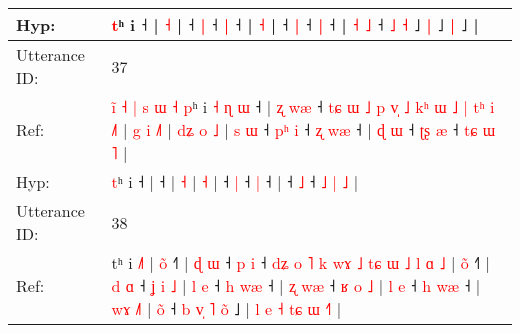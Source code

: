 \documentclass[10pt]{article}
\DeclareRobustCommand{\hl}[1]{{\textcolor{red}{#1}}}
\begin{document}
\begin{longtable}{ll}
 \\
Hyp: & \hl{}\hl{}\hl{}\hl{}\hl{}\hl{}\hl{}\hl{}\hl{}\hl{}\hl{}\hl{}\hl{}\hl{t}ʰ\hl{}\hl{}\hl{}\hl{}\hl{}\hl{} i ˧\hl{}\hl{}\hl{}\hl{}\hl{}\hl{} |\hl{}\hl{}\hl{}\hl{}\hl{} \hl{}\hl{˧} |\hl{}\hl{}\hl{}\hl{} ˧\hl{}\hl{}\hl{} \hl{|} ˧\hl{}\hl{} \hl{|} ˧ |\hl{}\hl{}\hl{}\hl{}\hl{}\hl{}\hl{}\hl{}\hl{}\hl{}\hl{}\hl{}\hl{}\hl{}\hl{}\hl{}\hl{}\hl{}\hl{}\hl{}\hl{}\hl{}\hl{}\hl{} \hl{˧} |\hl{}\hl{}\hl{}\hl{} ˧\hl{}\hl{}\hl{} \hl{|} ˧\hl{}\hl{} \hl{|} ˧ | \hl{˧} \hl{}\hl{˩} ˧ \hl{}\hl{˩} \hl{˧} ˩\hl{}\hl{} \hl{}\hl{|} ˩\hl{}\hl{}\hl{} \hl{|} ˩ |
 \\
\midrule
Utterance ID: & 37 \\
Ref: & \hl{i}\hl{̃}\hl{ }\hl{˧}\hl{ }\hl{|}\hl{ }\hl{s}\hl{ }\hl{ɯ}\hl{ }\hl{˧}\hl{ }\hl{p}ʰ i\hl{ }\hl{˧}\hl{ }\hl{ɳ}\hl{ }\hl{ɯ} ˧ |\hl{ }\hl{ʐ}\hl{ }\hl{w}\hl{æ} ˧\hl{ }\hl{t}\hl{ɕ}\hl{ }\hl{ɯ}\hl{ }\hl{˩}\hl{ }\hl{p}\hl{ }\hl{v}\hl{̩}\hl{ }\hl{˩}\hl{ }\hl{k}\hl{ʰ}\hl{ }\hl{ɯ}\hl{ }\hl{˩}\hl{ }\hl{|}\hl{ }\hl{t}\hl{ʰ}\hl{ }\hl{i}\hl{ }\hl{˩}\hl{˥} |\hl{ }\hl{g}\hl{ }\hl{i} \hl{˩}\hl{˥} |\hl{ }\hl{d}\hl{ʑ}\hl{ }\hl{o} \hl{˩} |\hl{ }\hl{s}\hl{ }\hl{ɯ} ˧\hl{ }\hl{p}\hl{ʰ} \hl{i} ˧\hl{ }\hl{ʐ} \hl{w}\hl{æ} ˧ |\hl{ }\hl{ɖ}\hl{ }\hl{ɯ} ˧\hl{ }\hl{ʈ}\hl{ʂ} \hl{æ} ˧ \hl{t}\hl{ɕ} \hl{ɯ} \hl{˥} |
 \\
Hyp: & \hl{}\hl{}\hl{}\hl{}\hl{}\hl{}\hl{}\hl{}\hl{}\hl{}\hl{}\hl{}\hl{}\hl{t}ʰ i\hl{}\hl{}\hl{}\hl{}\hl{}\hl{} ˧ |\hl{}\hl{}\hl{}\hl{}\hl{} ˧\hl{}\hl{}\hl{}\hl{}\hl{}\hl{}\hl{}\hl{}\hl{}\hl{}\hl{}\hl{}\hl{}\hl{}\hl{}\hl{}\hl{}\hl{}\hl{}\hl{}\hl{}\hl{}\hl{}\hl{}\hl{}\hl{}\hl{}\hl{}\hl{}\hl{}\hl{} |\hl{}\hl{}\hl{}\hl{} \hl{}\hl{˧} |\hl{}\hl{}\hl{}\hl{}\hl{} \hl{˧} |\hl{}\hl{}\hl{}\hl{} ˧\hl{}\hl{}\hl{} \hl{|} ˧\hl{}\hl{} \hl{}\hl{|} ˧ |\hl{}\hl{}\hl{}\hl{} ˧\hl{}\hl{}\hl{} \hl{˩} ˧ \hl{}\hl{˩} \hl{|} \hl{˩} |
 \\
\midrule
Utterance ID: & 38 \\
Ref: & tʰ i \hl{˩}\hl{˥} |\hl{ }\hl{o}\hl{̃} ˧\hl{˥} |\hl{ }\hl{ɖ}\hl{ }\hl{ɯ} ˧\hl{ }\hl{p} \hl{i} ˧\hl{ }\hl{d}\hl{ʑ}\hl{ }\hl{o}\hl{ }\hl{˥}\hl{ }\hl{k}\hl{ }\hl{w}\hl{ɤ}\hl{ }\hl{˩}\hl{ }\hl{t}\hl{ɕ}\hl{ }\hl{ɯ}\hl{ }\hl{˩}\hl{ }\hl{l}\hl{ }\hl{ɑ}\hl{ }\hl{˩} |\hl{ }\hl{o}\hl{̃} ˧\hl{˥} |\hl{ }\hl{d}\hl{ }\hl{ɑ} ˧\hl{ }\hl{ʝ}\hl{ }\hl{i}\hl{ }\hl{˩} |\hl{ }\hl{l}\hl{ }\hl{e} ˧\hl{ }\hl{h} \hl{w}\hl{æ} ˧ |\hl{ }\hl{ʐ}\hl{ }\hl{w}\hl{æ} ˧\hl{ }\hl{ʁ}\hl{ }\hl{o}\hl{ }\hl{˩} |\hl{ }\hl{l}\hl{ }\hl{e} ˧\hl{ }\hl{h} \hl{w}\hl{æ} ˧ |\hl{ }\hl{w}\hl{ɤ} \hl{˩}\hl{˥} |\hl{ }\hl{o}\hl{̃} ˧ \hl{b} \hl{v}\hl{̩} \hl{˥} \hl{o}\hl{̃} ˩ |\hl{ }\hl{l}\hl{ }\hl{e}\hl{ }\hl{˧} \hl{t}\hl{ɕ} \hl{ɯ} \hl{˧}\hl{˥} |

\end{longtable}
\end{document}
